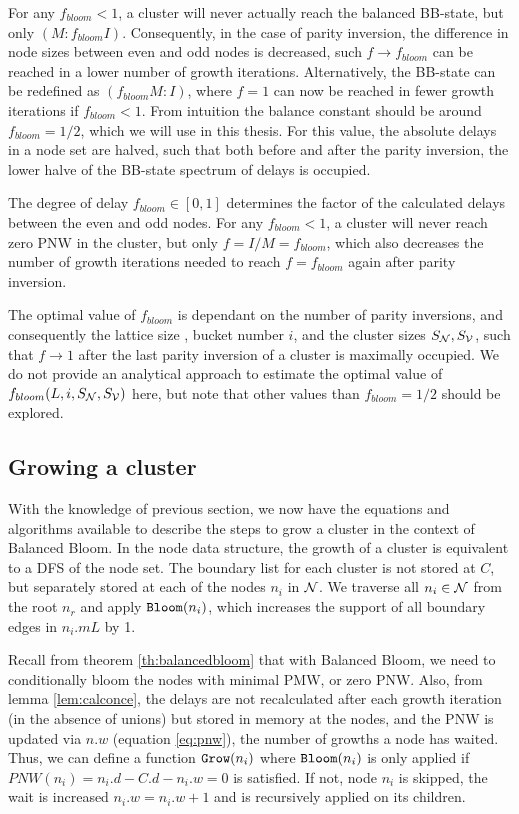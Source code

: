 For any $f_{bloom} < 1$, a cluster will never actually reach the balanced BB-state, but only $(M:f_{bloom}I)$. Consequently, in the case of parity inversion, the difference in node sizes between even and odd nodes is decreased, such $f\to f_{bloom}$ can be reached in a lower number of growth iterations. Alternatively, the BB-state can be redefined as $(f_{bloom}M:I)$, where $f=1$ can now be reached in fewer growth iterations if $f_{bloom} <1$.  From intuition the balance constant should be around $f_{bloom} = 1/2$, which we will use in this thesis. For this value, the absolute delays in a node set are halved, such that both before and after the parity inversion, the lower halve of the BB-state spectrum of delays is occupied.
\begin{theorem}
  The degree of delay $f_{bloom} \in [0, 1]$ determines the factor of the calculated delays between the even and odd nodes. For any $f_{bloom} < 1$, a cluster will never reach zero PNW in the cluster, but only $f=I/M=f_{bloom}$, which also decreases the number of growth iterations needed to reach $f=f_{bloom}$ again after parity inversion.
\end{theorem}

The optimal value of $f_{bloom}$ is dependant on the number of parity inversions, and consequently the lattice size , bucket number $i$, and the cluster sizes $S_{\mathcal{N}}, S_{\mathcal{V}}$, such that $f\to1$ after the last parity inversion of a cluster is maximally occupied. We do not provide an analytical approach to estimate the optimal value of $f_{bloom}(L, i, S_{\mathcal{N}}, S_{\mathcal{V}})$ here, but note that other values than $f_{bloom} = 1/2$ should be explored. \\

\subsection{Growing a cluster}\label{sec:growingcluster}
With the knowledge of previous section, we now have the equations and algorithms available to describe the steps to grow a cluster in the context of Balanced Bloom. In the node data structure, the growth of a cluster is equivalent to a DFS of the node set. The boundary list for each cluster is not stored at $C$, but separately stored at each of the nodes $n_i$ in $\mathcal{N}$. We traverse all $n_i \in \mathcal{N}$ from the root $n_r$ and apply $\texttt{Bloom}(n_i)$, which increases the support of all boundary edges in $n_i.m{L}$ by 1.

Recall from theorem \ref{th:balancedbloom} that with Balanced Bloom, we need to conditionally bloom the nodes with minimal PMW, or zero PNW. Also, from lemma \ref{lem:calconce}, the delays are not recalculated after each growth iteration (in the absence of unions) but stored in memory at the nodes, and the PNW is updated via $n.w$ (equation \ref{eq:pnw}), the number of growths a node has waited. Thus, we can define a function $\texttt{Grow}(n_i)$ where $\texttt{Bloom}(n_i)$ is only applied if $PNW(n_i) = n_i.d - C.d - n_i.w = 0$ is satisfied. If not, node $n_i$ is skipped, the wait is increased $n_i.w = n_i.w +1$ and  is recursively applied on its children.

